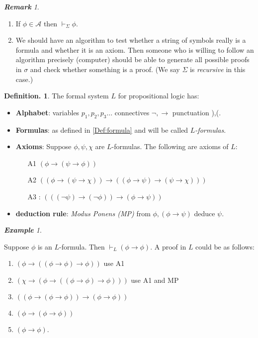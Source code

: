 \documentclass[a4paper,oneside,11pt,DIV=12,parskip=half]{scrartcl}
\theoremstyle{plain}
\theoremstyle{definition}
\newtheorem{definition}[theorem]{Definition.}
\newtheorem{remark, definition}[theorem]{Remark and Definition.}
\newtheorem{lemma, definition}[theorem]{Lemma and Definition.}
\newtheorem{theorem, definition}[theorem]{Theorem and Definition.}
\theoremstyle{remark}
\newtheorem*{remark}{\textbf{Remark}}
\newtheorem*{example}{\textbf{Example}}
\newtheorem*{remark, example}{\textbf{Remark and Exercise}}
\begin{document}
\begin{remark}
\begin{enumerate}
    \item If $\phi \in \mathcal{A}$ then $\vdash_\Sigma \phi$.
    \item We should have an algorithm to test whether a string of symbols really is a formula and whether it is an axiom. Then someone who is willing to follow an algorithm precisely (computer) should be able to generate all possible proofs in $\sigma$ and check whether something is a proof. (We say $\Sigma$ is \emph{recursive} in this case.)
\end{enumerate}
\end{remark}

\begin{definition}
The formal system $L$ for propositional logic has:

\begin{itemize}
    \item \textbf{Alphabet}: variables $p_1,p_2,p_3\dots$  connectives $\lnot,\rightarrow$
    punctuation ),(.
    \item \textbf{Formulas}: as defined in \ref{Def:formula} and will be called \emph{$L$-formulas}.
    \item \textbf{Axioms}: Suppose $\phi,\psi,\chi$ are $L$-formulas. The following are axioms of $L$:
    \begin{itemize}
        \item[A1] $(\phi \rightarrow (\psi \rightarrow \phi))$
        \item[A2] $((\phi \rightarrow (\psi \rightarrow \chi)) \rightarrow ((\phi \rightarrow \psi) \rightarrow (\psi \rightarrow \chi)))$
        \item[A3]: $(((\lnot \psi) \rightarrow ( \lnot \phi)) \rightarrow (\phi \rightarrow \psi))$
    \end{itemize}
    \item \textbf{deduction rule}: \emph{ Modus Ponens (MP)} from $\phi,  (\phi \rightarrow \psi)$ deduce $\psi$.
\end{itemize}

\begin{example} \label{rem:phi_implies_phi}

Suppose $\phi$ is an $L$-formula. Then $\vdash_L (\phi \rightarrow \phi)$.
A proof in $L$ could be as follows:
\begin{enumerate}
    \item $(\phi \rightarrow ((\phi \rightarrow \phi) \rightarrow \phi))$ use A1
    \item $(\chi \rightarrow (\phi \rightarrow ((\phi \rightarrow \phi) \rightarrow \phi)))$ use A1 and MP
    \item $((\phi \rightarrow (\phi \rightarrow \phi)) \rightarrow (\phi \rightarrow \phi))$
    \item $(\phi \rightarrow (\phi \rightarrow \phi))$
    \item $(\phi \rightarrow \phi)$.
\end{enumerate}
\end{example}
\end{definition}
\end{document}
